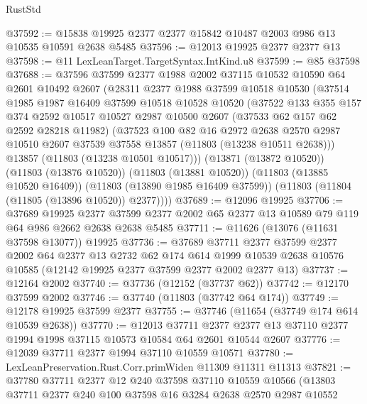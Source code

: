 \begin{lexlean}{RustStd}
\begin{coremodule}
@37592 := @15838 @19925 @2377 @2377 @15842 @10487 @2003 @986 @13 @10535 @10591 @2638 @5485
@37596 := @12013 @19925 @2377 @2377 @13
@37598 := @11 LexLeanTarget.TargetSyntax.IntKind.u8
@37599 := @85 @37598
@37688 := @37596
    @37599
    @2377
    @1988
    @2002
    @37115
    @10532
    @10590
    @64
    @2601
    @10492
    @2607
    (@28311
      @2377
      @1988
      @37599
      @10518
      @10530
      (@37514
        @1985
        @1987
        @16409
        @37599
        @10518
        @10528
        @10520
        (@37522
          @133
          @355
          @157
          @374
          @2592
          @10517
          @10527
          @2987
          @10500
          @2607
          (@37533 @62 @157 @62 @2592 @28218 @11982)
          (@37523
            @100
            @82
            @16
            @2972
            @2638
            @2570
            @2987
            @10510
            @2607
            @37539
            @37558
            @13857
            (@11803 (@13238 @10511 @2638)))
          @13857
          (@11803 (@13238 @10501 @10517)))
        (@13871 (@13872 @10520))
        (@11803 (@13876 @10520))
        (@11803 (@13881 @10520))
        (@11803 (@13885 @10520 @16409))
        (@11803 (@13890 @1985 @16409 @37599))
        (@11803 (@11804 (@11805 (@13896 @10520)) @2377))))
@37689 := @12096 @19925
@37706 := @37689
    @19925
    @2377
    @37599
    @2377
    @2002
    @65
    @2377
    @13
    @10589
    @79
    @119
    @64
    @986
    @2662
    @2638
    @2638
    @5485
@37711 := @11626 (@13076 (@11631 @37598 @13077)) @19925
@37736 := @37689
    @37711
    @2377
    @37599
    @2377
    @2002
    @64
    @2377
    @13
    @2732
    @62
    @174
    @614
    @1999
    @10539
    @2638
    @10576
    @10585
    (@12142 @19925 @2377 @37599 @2377 @2002 @2377 @13)
@37737 := @12164 @2002
@37740 := @37736 (@12152 (@37737 @62))
@37742 := @12170 @37599 @2002
@37746 := @37740 (@11803 (@37742 @64 @174))
@37749 := @12178 @19925 @37599 @2377
@37755 := @37746 (@11654 (@37749 @174 @614 @10539 @2638))
@37770 := @12013
    @37711
    @2377
    @2377
    @13
    @37110
    @2377
    @1994
    @1998
    @37115
    @10573
    @10584
    @64
    @2601
    @10544
    @2607
@37776 := @12039 @37711 @2377 @1994 @37110 @10559 @10571
@37780 := LexLeanPreservation.Rust.Corr.primWiden @11309 @11311 @11313
@37821 := @37780
    @37711
    @2377
    @12
    @240
    @37598
    @37110
    @10559
    @10566
    (@13803
      @37711
      @2377
      @240
      @100
      @37598
      @16
      @3284
      @2638
      @2570
      @2987
      @10552

\end{coremodule}
\end{lexlean}
